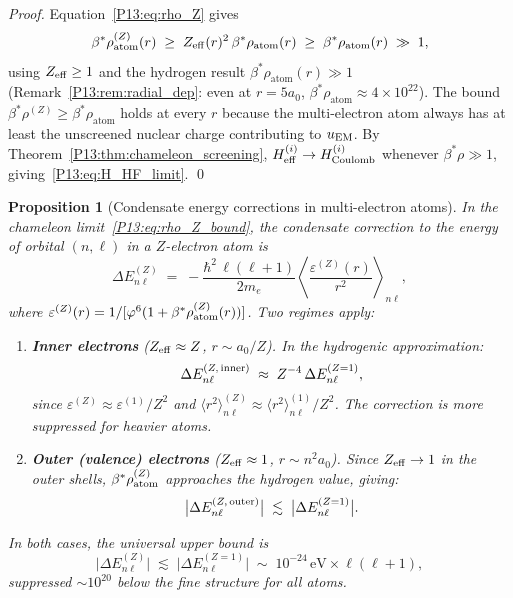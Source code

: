 \documentclass[11pt,a4paper]{article}
\newtheorem{proposition}[theorem]{Proposition}
\theoremstyle{definition}
\theoremstyle{remark}
\newcommand{\vp}{\varphi}
\newcommand{\bst}{\beta^{*}}
\newcommand{\eps}{\varepsilon}
\newcommand{\Heff}{H_{\mathrm{eff}}}
\newcommand{\rhoa}{\rho_{\mathrm{atom}}}
\begin{document}
\begin{proof}
Equation~\eqref{P13:eq:rho_Z} gives
\begin{equation}
  \bst\rho_{\rm atom}^{(Z)}(r)
  \;\ge\; Z_{\rm eff}(r)^2\,\bst\rhoa(r)
  \;\ge\; \bst\rhoa(r)
  \;\gg\; 1,
  \label{P13:eq:rho_Z_bound}
\end{equation}
using $Z_{\rm eff}\ge1$ and the hydrogen result $\bst\rhoa(r)\gg1$
(Remark~\ref{P13:rem:radial_dep}: even at $r=5a_0$, $\bst\rhoa\approx4\times10^{22}$).
The bound $\bst\rho^{(Z)}\ge\bst\rhoa$ holds at every $r$ because the
multi-electron atom always has at least the unscreened nuclear charge
contributing to $u_{\rm EM}$.
By Theorem~\ref{P13:thm:chameleon_screening}, $\Heff^{(i)}\to H_{\rm Coulomb}^{(i)}$
whenever $\bst\rho\gg1$, giving~\eqref{P13:eq:H_HF_limit}.
\qed
\end{proof}

\begin{proposition}[Condensate energy corrections in multi-electron atoms]
\label{P13:prop:multi_electron_energy}
In the chameleon limit~\eqref{P13:eq:rho_Z_bound}, the condensate
correction to the energy of orbital $(n,\ell)$ in a $Z$-electron atom is
\begin{equation}
  \Delta E_{n\ell}^{(Z)}
  \;=\; -\frac{\hbar^2\,\ell(\ell+1)}{2m_e}
        \left\langle\frac{\eps^{(Z)}(r)}{r^2}\right\rangle_{n\ell},
  \label{P13:eq:delta_E_Z}
\end{equation}
where $\eps^{(Z)}(r)=1/[\vp^6(1+\bst\rho_{\rm atom}^{(Z)}(r))]$.
Two regimes apply:
\begin{enumerate}[noitemsep,label=(\roman*)]
\item \textbf{Inner electrons} ($Z_{\rm eff}\approx Z$, $r\sim a_0/Z$).
  In the hydrogenic approximation:
  \begin{equation}
    \Delta E_{n\ell}^{(Z,\,\rm inner)}
    \;\approx\; Z^{-4}\,\Delta E_{n\ell}^{(Z=1)},
    \label{P13:eq:delta_E_inner}
  \end{equation}
  since $\eps^{(Z)}\approx\eps^{(1)}/Z^2$ and
  $\langle r^2\rangle_{n\ell}^{(Z)}\approx\langle r^2\rangle_{n\ell}^{(1)}/Z^2$.
  The correction is \emph{more suppressed} for heavier atoms.

\item \textbf{Outer (valence) electrons} ($Z_{\rm eff}\approx 1$, $r\sim n^2 a_0$).
  Since $Z_{\rm eff}\to1$ in the outer shells,
  $\bst\rho_{\rm atom}^{(Z)}$ approaches the hydrogen value, giving:
  \begin{equation}
    \bigl|\Delta E_{n\ell}^{(Z,\,\rm outer)}\bigr|
    \;\lesssim\; \bigl|\Delta E_{n\ell}^{(Z=1)}\bigr|.
    \label{P13:eq:delta_E_outer}
  \end{equation}
\end{enumerate}
In both cases, the universal upper bound is
\begin{equation}
  \bigl|\Delta E_{n\ell}^{(Z)}\bigr|
  \;\lesssim\; \bigl|\Delta E_{n\ell}^{(Z=1)}\bigr|
  \;\sim\; 10^{-24}\,\mathrm{eV}\times\ell(\ell+1),
  \label{P13:eq:delta_E_bound}
\end{equation}
suppressed $\sim10^{20}$ below the fine structure for all atoms.
\end{proposition}
\end{document}

